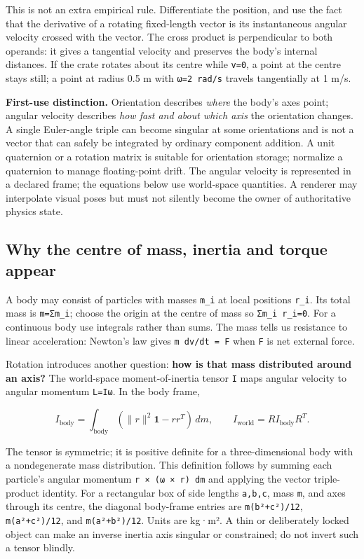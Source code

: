 This is not an extra empirical rule. Differentiate the position, and use the fact that the derivative of a rotating fixed-length vector is its instantaneous angular velocity crossed with the vector. The cross product is perpendicular to both operands: it gives a tangential velocity and preserves the body's internal distances. If the crate rotates about its centre while \texttt{v=0}, a point at the centre stays still; a point at radius 0.5 m with \texttt{\textbar{}ω\textbar{}=2\ rad/s} travels tangentially at 1 m/s.

\textbf{First-use distinction.} Orientation describes \emph{where} the body's axes point; angular velocity describes \emph{how fast and about which axis} the orientation changes. A single Euler-angle triple can become singular at some orientations and is not a vector that can safely be integrated by ordinary component addition. A unit quaternion or a rotation matrix is suitable for orientation storage; normalize a quaternion to manage floating-point drift. The angular velocity is represented in a declared frame; the equations below use world-space quantities. A renderer may interpolate visual poses but must not silently become the owner of authoritative physics state.

\subsection{Why the centre of mass, inertia and torque appear}\label{02-foundations-ii-ch039-why-the-centre-of-mass-inertia-and-torque-appear}

A body may consist of particles with masses \texttt{m\_i} at local positions \texttt{r\_i}. Its total mass is \texttt{m=Σm\_i}; choose the origin at the centre of mass so \texttt{Σm\_i\ r\_i=0}. For a continuous body use integrals rather than sums. The mass tells us resistance to linear acceleration: Newton's law gives \texttt{m\ dv/dt\ =\ F} when \texttt{F} is net external force.

Rotation introduces another question: \textbf{how is that mass distributed around an axis?} The world-space moment-of-inertia tensor \texttt{I} maps angular velocity to angular momentum \texttt{L=Iω}. In the body frame,

\[
I_{\mathrm{body}}=\int_{\mathrm{body}}(\|r\|^2\mathbf{1}-rr^T)\,dm,
\qquad I_{\mathrm{world}}=R I_{\mathrm{body}}R^T.
\]

The tensor is symmetric; it is positive definite for a three-dimensional body with a nondegenerate mass distribution. This definition follows by summing each particle's angular momentum \texttt{r\ ×\ (ω\ ×\ r)\ dm} and applying the vector triple-product identity. For a rectangular box of side lengths \texttt{a,b,c}, mass \texttt{m}, and axes through its centre, the diagonal body-frame entries are \texttt{m(b²+c²)/12}, \texttt{m(a²+c²)/12}, and \texttt{m(a²+b²)/12}. Units are kg·m². A thin or deliberately locked object can make an inverse inertia axis singular or constrained; do not invert such a tensor blindly.

